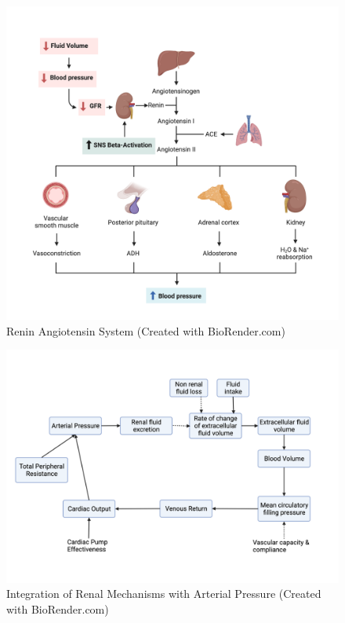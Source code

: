 \begin{figure}[!h]
    \centering
    \includegraphics[width=1\linewidth]{./figure/raas.png}
    \caption{Renin Angiotensin System \footnotesize{(Created with BioRender.com)}}
    \label{fig:raas}
\end{figure}

\begin{figure}[!h]
    \centering
    \includegraphics[width=1\linewidth]{./figure/integrated_renal_bp.png}
    \caption{Integration of Renal Mechanisms with Arterial Pressure  \footnotesize{(Created with BioRender.com)}}
    \label{fig:integrated_renal_bp}
\end{figure}

